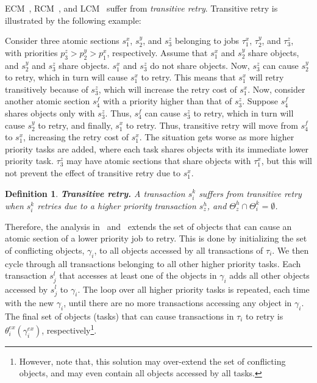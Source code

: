 \documentclass[conference]{IEEEtran}
\newtheorem{mydef}{Definition}
\begin{document}
ECM~\cite{stmconcurrencycontrol:emsoft11}, RCM~\cite{stmconcurrencycontrol:emsoft11}, and LCM~\cite{lcmdac2012} suffer from \textit{transitive retry}. Transitive retry is illustrated by the following example:

Consider three atomic sections $s_{1}^{x}$, $s_{2}^{y}$, 
and $s_{3}^{z}$ belonging to jobs $\tau_{1}^{x}$, $\tau_{2}^{y}$, 
and $\tau_{3}^{z}$, with priorities $p_{3}^{z}>p_{2}^{y}>p_{1}^{x}$, respectively. 
Assume that $s_{1}^{x}$ and $s_{2}^{y}$ share objects, and $s_{2}^{y}$ and $s_{3}^{z}$ share objects. $s_{1}^{x}$ and $s_{3}^{z}$ do not share objects.
Now, $s_{3}^{z}$ can cause $s_{2}^{y}$ to retry, which in turn will cause $s_{1}^{x}$ to retry. This means that $s_{1}^{x}$ will retry transitively
because of $s_{3}^{z}$, which will increase the retry cost of $s_{1}^{x}$. Now, consider another atomic section $s_4^f$ with a priority higher than that of $s_3^z$. Suppose $s_4^f$ shares objects only with $s_3^z$. Thus, $s_4^f$ can cause $s_3^z$ to retry, which in turn will cause $s_2^y$ to retry, and finally, $s_1^x$ to retry. Thus, transitive retry will move from $s_{4}^{f}$ to $s_{1}^{x}$, increasing the retry cost of $s_{1}^{x}$. The situation gets worse as more higher priority tasks are added, where each task shares objects with its immediate lower priority task. $\tau_{3}^{z}$ may have atomic sections that share objects with $\tau_{1}^{x}$,
but this will not prevent the effect of transitive retry due to $s_{1}^{x}$.

\begin{mydef}
\label{defn:trans-retry}
\textbf{Transitive retry.} A transaction $s_{i}^{k}$ suffers from
transitive retry when $s_i^k$ retries due to a higher priority transaction $s_z^h$, and $\Theta_z^h \cap \Theta_i^k=\emptyset$.
\end{mydef}

Therefore, the analysis in~\cite{stmconcurrencycontrol:emsoft11} and~\cite{lcmdac2012} extends the set of objects that can cause an atomic section of a lower priority job to retry.  This is done by initializing the set of conflicting objects, $\gamma_i$, to all objects accessed by all transactions of $\tau_i$. We then cycle through all transactions belonging to all other higher priority tasks. Each transaction $s_j^l$ that accesses at least one of the objects in $\gamma_i$ adds all other objects accessed by $s_j^l$ to $\gamma_i$. The loop over all higher priority tasks is repeated, each time with the new $\gamma_i$, until there are no more transactions accessing any object in $\gamma_i$. The final set of objects (tasks) that can cause transactions in $\tau_i$ to retry is $\theta_i^{ex}(\gamma_i^{ex})$, respectively\footnote{However, note that, this solution may over-extend the set of conflicting objects, and may even contain all objects accessed by all tasks.}. 
\end{document}

